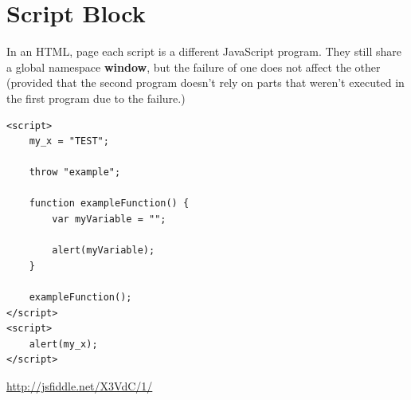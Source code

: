 \documentclass {article}
\begin{document}
	
\section{Script Block}
	In an HTML, page each script is a different JavaScript program.  They still share a global namespace {\bf window}, but the failure of one does not affect the other (provided that the second program doesn't rely on parts that weren't executed in the first program due to the failure.)

\begin{lstlisting}
<script>
    my_x = "TEST";

    throw "example";

    function exampleFunction() {
        var myVariable = "";

        alert(myVariable);
    }

    exampleFunction();
</script>
<script>
    alert(my_x);
</script>
\end{lstlisting}
\url{http://jsfiddle.net/X3VdC/1/}
\end{document}
